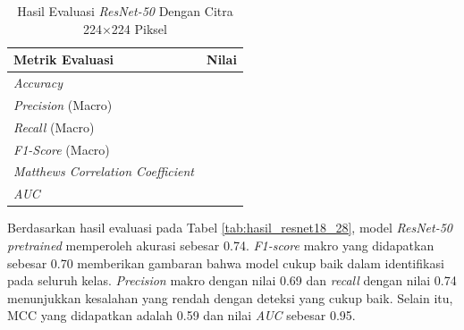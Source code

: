 \begin{table}[H]
    \centering
    \caption{Hasil Evaluasi \textit{ResNet-50} Dengan Citra 224$\times$224 Piksel}
    \label{tab:hasil_resnet50_224}
    \begin{tabular}{>{\raggedright\arraybackslash}m{} 
                    >{\centering\arraybackslash}m{}}
        \toprule
        \textbf{Metrik Evaluasi} & \textbf{Nilai} \\
        \midrule
        \textit{Accuracy} & 0.74 \\
        \textit{Precision} (Macro) & 0.69 \\
        \textit{Recall} (Macro) & 0.74 \\
        \textit{F1-Score} (Macro) & 0.70 \\
        \textit{Matthews Correlation Coefficient} & 0.59 \\
        \textit{AUC} & 0.95 \\
        \bottomrule
    \end{tabular}
\end{table}

Berdasarkan hasil evaluasi pada Tabel \ref{tab:hasil_resnet18_28}, model 
\textit{ResNet-50 pretrained} memperoleh akurasi sebesar 0.74. \textit{F1-score} makro 
yang didapatkan sebesar 0.70 memberikan gambaran bahwa model cukup baik 
dalam identifikasi pada seluruh kelas. \textit{Precision} makro dengan 
nilai 0.69 dan \textit{recall} dengan nilai 0.74 menunjukkan kesalahan 
yang rendah dengan deteksi yang cukup baik. Selain itu, MCC yang didapatkan 
adalah 0.59 dan nilai \textit{AUC} sebesar 0.95. \par




